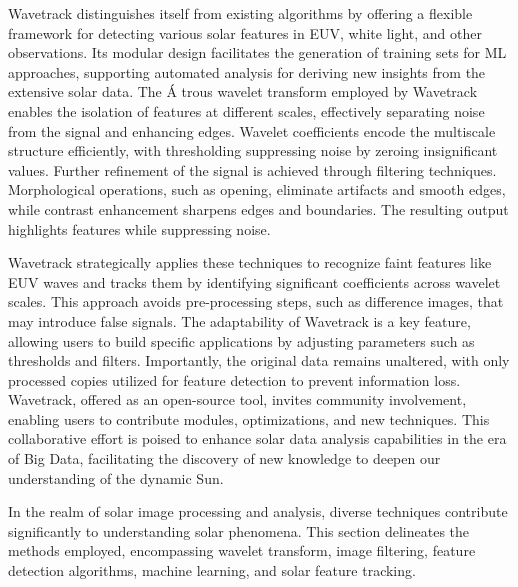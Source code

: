 Wavetrack distinguishes itself from existing algorithms by offering a flexible framework for detecting various solar features in EUV, white light, and other observations. Its modular design facilitates the generation of training sets for ML approaches, supporting automated analysis for deriving new insights from the extensive solar data. The \'A trous wavelet transform employed by Wavetrack enables the isolation of features at different scales, effectively separating noise from the signal and enhancing edges. Wavelet coefficients encode the multiscale structure efficiently, with thresholding suppressing noise by zeroing insignificant values. Further refinement of the signal is achieved through filtering techniques. Morphological operations, such as opening, eliminate artifacts and smooth edges, while contrast enhancement sharpens edges and boundaries. The resulting output highlights features while suppressing noise.

Wavetrack strategically applies these techniques to recognize faint features like EUV waves and tracks them by identifying significant coefficients across wavelet scales. This approach avoids pre-processing steps, such as difference images, that may introduce false signals. The adaptability of Wavetrack is a key feature, allowing users to build specific applications by adjusting parameters such as thresholds and filters. Importantly, the original data remains unaltered, with only processed copies utilized for feature detection to prevent information loss.
Wavetrack, offered as an open-source tool, invites community involvement, enabling users to contribute modules, optimizations, and new techniques. This collaborative effort is poised to enhance solar data analysis capabilities in the era of Big Data, facilitating the discovery of new knowledge to deepen our understanding of the dynamic Sun.

In the realm of solar image processing and analysis, diverse techniques contribute significantly to understanding solar phenomena. This section delineates the methods employed, encompassing wavelet transform, image filtering, feature detection algorithms, machine learning, and solar feature tracking.

